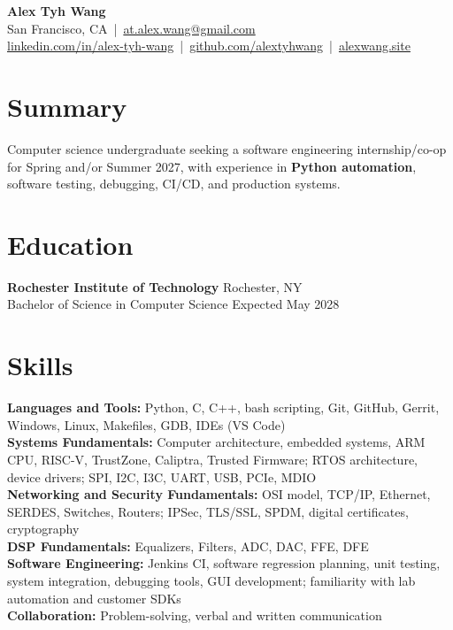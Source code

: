 \documentclass[10pt,letterpaper]{article}
\begin{document}
\begin{center}
{\Large \textbf{Alex Tyh Wang}}\\
San Francisco, CA \,|\, \href{mailto:at.alex.wang@gmail.com}{at.alex.wang@gmail.com}\\
\small \href{https://www.linkedin.com/in/alex-tyh-wang/}{linkedin.com/in/alex-tyh-wang} \,|\, \href{https://github.com/alextyhwang}{github.com/alextyhwang} \,|\, \href{https://alexwang.site}{alexwang.site}
\end{center}

\section*{Summary}
Computer science undergraduate seeking a software engineering internship/co-op for Spring and/or Summer 2027, with experience in \textbf{Python automation}, software testing, debugging, CI/CD, and production systems.

\section*{Education}
\textbf{Rochester Institute of Technology} \hfill Rochester, NY\\
Bachelor of Science in Computer Science \hfill Expected May 2028

\section*{Skills}
\textbf{Languages and Tools:} Python, C, C++, bash scripting, Git, GitHub, Gerrit, Windows, Linux, Makefiles, GDB, IDEs (VS Code)\\
\textbf{Systems Fundamentals:} Computer architecture, embedded systems, ARM CPU, RISC-V, TrustZone, Caliptra, Trusted Firmware; RTOS architecture, device drivers; SPI, I2C, I3C, UART, USB, PCIe, MDIO\\
\textbf{Networking and Security Fundamentals:} OSI model, TCP/IP, Ethernet, SERDES, Switches, Routers; IPSec, TLS/SSL, SPDM, digital certificates, cryptography\\
\textbf{DSP Fundamentals:} Equalizers, Filters, ADC, DAC, FFE, DFE\\
\textbf{Software Engineering:} Jenkins CI, software regression planning, unit testing, system integration, debugging tools, GUI development; familiarity with lab automation and customer SDKs\\
\textbf{Collaboration:} Problem-solving, verbal and written communication
\end{document}
